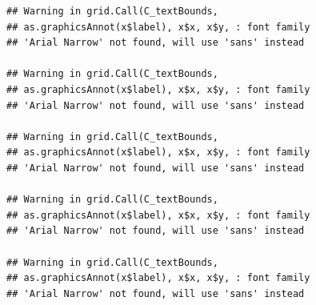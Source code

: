 \documentclass[]{krantz}
\begin{document}
\begin{verbatim}
## Warning in grid.Call(C_textBounds,
## as.graphicsAnnot(x$label), x$x, x$y, : font family
## 'Arial Narrow' not found, will use 'sans' instead

## Warning in grid.Call(C_textBounds,
## as.graphicsAnnot(x$label), x$x, x$y, : font family
## 'Arial Narrow' not found, will use 'sans' instead

## Warning in grid.Call(C_textBounds,
## as.graphicsAnnot(x$label), x$x, x$y, : font family
## 'Arial Narrow' not found, will use 'sans' instead

## Warning in grid.Call(C_textBounds,
## as.graphicsAnnot(x$label), x$x, x$y, : font family
## 'Arial Narrow' not found, will use 'sans' instead

## Warning in grid.Call(C_textBounds,
## as.graphicsAnnot(x$label), x$x, x$y, : font family
## 'Arial Narrow' not found, will use 'sans' instead
\end{verbatim}
\end{document}
